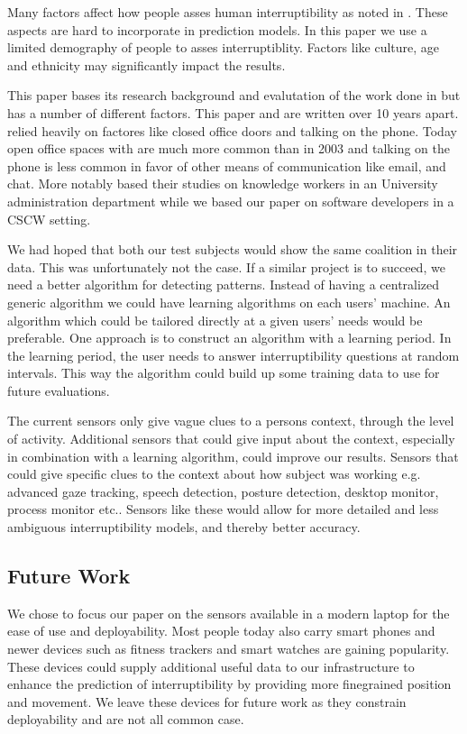 \documentclass{sigchi}
\begin{document}
Many factors affect how people asses human interruptibility as noted in \cite{Avrahami2007}.
These aspects are hard to incorporate in prediction models.
In this paper we use a limited demography of people to asses interruptiblity.
Factors like culture, age and ethnicity may significantly impact the results.

This paper bases its research background and evalutation of the work done in \cite{fogarty2005predicting} but has a number of different factors. This paper and \cite{fogarty2005predicting} are written over 10 years apart. \cite{fogarty2005predicting} relied heavily on factores like closed office doors and talking on the phone. Today open office spaces with are much more common than in 2003 and talking on the phone is less common in favor of other means of communication like email, and chat. More notably \cite{fogarty2005predicting} based their studies on knowledge workers in an University administration department while we based our paper on software developers in a CSCW setting.

We had hoped that both our test subjects would show the same coalition in their data.
This was unfortunately not the case.
If a similar project is to succeed, we need a better algorithm for detecting patterns.
Instead of having a centralized generic algorithm we could have learning algorithms on each users’ machine.
An algorithm which could be tailored directly at a given users’ needs would be preferable.
One approach is to construct an algorithm with a learning period.
In the learning period, the user needs to answer interruptibility questions at random intervals.
This way the algorithm could build up some training data to use for future evaluations.

The current sensors only give vague clues to a persons context, through the level of activity.
Additional sensors that could give input about the context, especially in combination with a learning algorithm, could improve our results.
Sensors that could give specific clues to the context about how subject was working e.g. advanced gaze tracking, speech detection, posture detection, desktop monitor, process monitor etc..
Sensors like these would allow for more detailed and less ambiguous interruptibility models, and thereby better accuracy.


\subsection{Future Work}
We chose to focus our paper on the sensors available in a modern laptop for the ease of use and deployability.
Most people today also carry smart phones and newer devices such as fitness trackers and smart watches are gaining popularity.
These devices could supply additional useful data to our infrastructure to enhance the prediction of interruptibility by providing more finegrained position and movement.
We leave these devices for future work as they constrain deployability and are not all common case.
\end{document}
